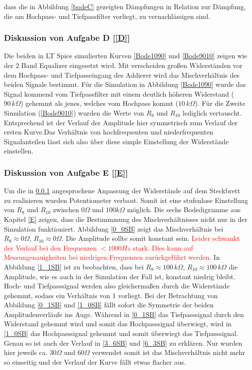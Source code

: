 dass die in Abbildung \ref{bodeC} gezeigten Dämpfungen in Relation zur Dämpfung, die am Hochpass- und Tiefpassfilter vorliegt, zu vernachlässigen sind.
\subsubsection{Diskussion von Aufgabe D [\ref{D}]}
\label{DiskussionD}
Die beiden in LT Spice simulierten Kurven \ref{Bode1090} und \ref{Bode9010} zeigen wie der 2 Band Equalizer eingesetzt wird. Mit verscheiden großen Widerständen vor dem Hochpass- und Tiefpasseingang des Addierer wird das Mischverhältnis des beiden Signale bestimmt. Für die Simulation in Abbildung \ref{Bode1090} wurde das Signal kommend vom Tiefpassfilter mit einem deutlich höheren Widerstand ($\si{90}{\,k \Omega}$) gehemmt als jenes, welches vom Hochpass kommt ($\si{10}{\,k\Omega}$). Für die Zweite Simulation (\ref{Bode9010}) wurden die Werte von $R_{8}$ und $R_{10}$ lediglich vertauscht. Entsprechend ist der Verlauf der Amplitude hier symmetrisch zum Verlauf der ersten Kurve.\newline Das Verhältnis von hochfrequenten und niederfrequenten Signalanteilen lässt sich also über diese simple Einstellung der Widerstände einstellen.

\subsubsection{Diskussion von Aufgabe E [\ref{E}]}
Um die in \ref{DiskussionD} angesprochene Anpassung der Widerstände auf dem Steckbrett zu realisieren wurden Potentiometer verbaut. Somit ist eine stufenlose Einstellung von $R_{8}$ und $R_{10}$ zwischen $\si{0}{\Omega}$ und $\si{100}{k\Omega}$ möglich. Die sechs Bodedigramme aus Kapitel \ref{E} zeigen, dass die Bestimmmung des Mischverhältnisses nicht nur in der Simulation funktioniert. Abbildung \ref{0_0SB} zeigt das Mischverhältnis bei $R_{8}\approx \si{0}{\Omega}$, $R_{10}\approx \si{0}{\Omega}$. Die Amplitude sollte somit konstant sein. \textcolor{red}{Leider schwankt der Verlauf bei den Frequenzen $\si{<1000}{Hz}$ stark. Dies kann auf Messungenauigkeiten bei niedrigen Frequenzen zurückgeführt werden.}
In Abbildung \ref{1_1SB} ist zu beobachten, dass bei $R_{8}\approx \si{100}{\,k\Omega}$, $R_{10}\approx \si{100}{\,k\Omega}$ die Amplitude, wie es auch in der Simulation der Fall ist, konstant niedrig bleibt. Hoch- und Tiefpasssignal werden also gleichermaßen durch die Widerstände gehemmt, sodass ein Verhältnis von 1 vorliegt.
Bei der Betrachtung von Abbildung \ref{0_1SB} und \ref{1_0SB} fällt sofort die Symmetrie der beiden Amplitudenverläufe ins Auge. Während in \ref{0_1SB} das Tiefpasssignal durch den Widerstand gehemmt wird und somit das Hochpasssignal überwiegt, wird in \ref{1_0SB} das Hochpasssignal gehemmt und somit überwiegt das Tiefpasssignal.
Genau so ist auch der Verlauf in \ref{3_6SB} und \ref{6_3SB} zu erklären. Nur wurden hier jeweils ca. $\si{30}{\Omega}$ und $\si{60}{\Omega}$ verwendet somit ist das Mischverhältnis nicht mehr so einseitig und der Verlauf der Kurve fällt etwas flacher aus.

